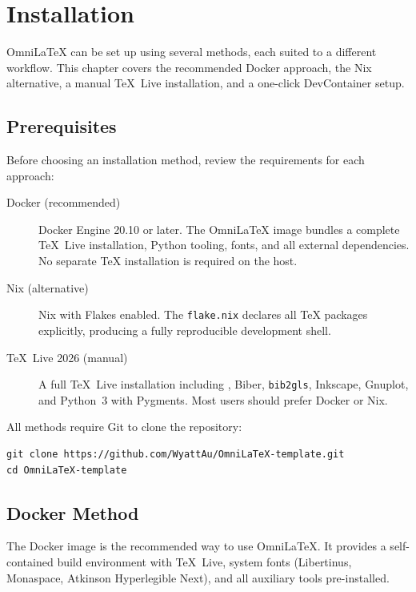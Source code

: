 \chapter{Installation}
\label{ch:installation}

OmniLaTeX can be set up using several methods, each suited to a different
workflow.  This chapter covers the recommended Docker approach, the Nix
alternative, a manual TeX~Live installation, and a one-click DevContainer setup.

\section{Prerequisites}
\label{sec:prerequisites}

Before choosing an installation method, review the requirements for each
approach:

\begin{description}
    \item[Docker (recommended)] Docker Engine 20.10 or later.  The OmniLaTeX
        image bundles a complete TeX~Live installation, Python tooling,
        fonts, and all external dependencies.  No separate \TeX{} installation
        is required on the host.
    \item[Nix (alternative)] Nix with Flakes enabled.  The \texttt{flake.nix}
        declares all \TeX{} packages explicitly, producing a fully
        reproducible development shell.
    \item[TeX~Live 2026 (manual)] A full TeX~Live installation including
        , Biber, \texttt{bib2gls}, Inkscape, Gnuplot, and
        Python~3 with Pygments.  Most users should prefer Docker or Nix.
\end{description}

All methods require Git to clone the repository:

\begin{verbatim}
git clone https://github.com/WyattAu/OmniLaTeX-template.git
cd OmniLaTeX-template
\end{verbatim}

\section{Docker Method}

The Docker image is the recommended way to use OmniLaTeX.  It provides a
self-contained build environment with TeX~Live, system fonts (Libertinus,
Monaspace, Atkinson Hyperlegible Next), and all auxiliary tools pre-installed.

